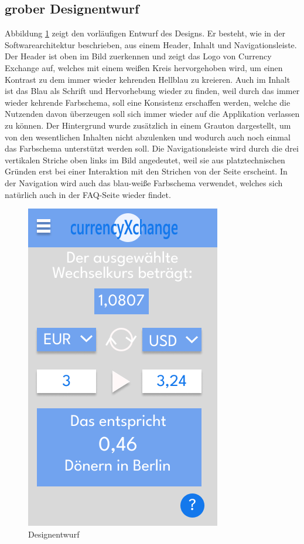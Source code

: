 \documentclass[conference]{IEEEtran}
\begin{document}
\subsection{grober Designentwurf}
Abbildung \ref{fig:designentwurf} zeigt den vorläufigen Entwurf des Designs. Er besteht, wie in der Softwarearchitektur beschrieben, aus einem Header, Inhalt und Navigationsleiste. Der Header ist oben im Bild zuerkennen und zeigt das Logo von Currency Exchange auf, welches mit einem weißen Kreis hervorgehoben wird, um einen Kontrast zu dem immer wieder kehrenden Hellblau zu kreieren. Auch im Inhalt ist das Blau als Schrift und Hervorhebung wieder zu finden, weil durch das immer wieder kehrende Farbschema, soll eine Konsistenz erschaffen werden, welche die Nutzenden davon überzeugen soll sich immer wieder auf die Applikation verlassen zu können. Der Hintergrund wurde zusätzlich in einem Grauton dargestellt, um von den wesentlichen Inhalten nicht abzulenken und wodurch auch noch einmal das Farbschema unterstützt werden soll. Die Navigationsleiste wird durch die drei vertikalen Striche oben links im Bild angedeutet, weil sie aus platztechnischen Gründen erst bei einer Interaktion mit den Strichen von der Seite erscheint. In der Navigation wird auch das blau-weiße Farbschema verwendet, welches sich natürlich auch in der FAQ-Seite wieder findet.
\begin{figure}[h]
	\centering
	\includegraphics[width=0.5\linewidth, frame]{designentwurf}
	\caption[Designentwurf]{Designentwurf}
	\label{fig:designentwurf}
\end{figure}
\end{document}
